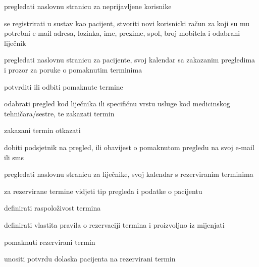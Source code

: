 			
			\begin{packed_enum}
				
				\item  {}
				
				\begin{packed_enum}
					
					\item pregledati naslovnu stranicu za neprijavljene korisnike
					\item se registrirati u sustav kao pacijent, stvoriti novi korisnicki račun za koji su mu potrebni e-mail adresa, lozinka, ime, prezime, spol, broj mobitela i odabrani liječnik
					
				\end{packed_enum}
				
				\item  {}
				
				\begin{packed_enum}
					
					\item pregledati naslovnu stranicu za pacijente, svoj kalendar sa zakazanim pregledima i prozor za poruke o pomaknutim terminima
					\item potvrditi ili odbiti pomaknute termine
					\item odabrati pregled kod liječnika ili specifičnu vrstu usluge kod medicinskog tehničara/sestre, te zakazati termin
					\item zakazani termin otkazati
					\item dobiti podsjetnik na pregled, ili obavijest o pomaknutom pregledu na svoj e-mail ili sms
					
				\end{packed_enum}
				
				\item  {}
				
				\begin{packed_enum}
					
					\item pregledati naslovnu stranicu za liječnike, svoj kalendar s rezerviranim terminima
					\item za rezervirane termine vidjeti tip pregleda i podatke o pacijentu
					\item definirati raspoloživost termina
					\item definirati vlastita pravila o rezervaciji termina i proizvoljno iz mijenjati
					\item pomaknuti rezervirani termin
					\item unositi potvrdu dolaska pacijenta na rezervirani termin
					

\end{packed_enum}
\end{packed_enum}
